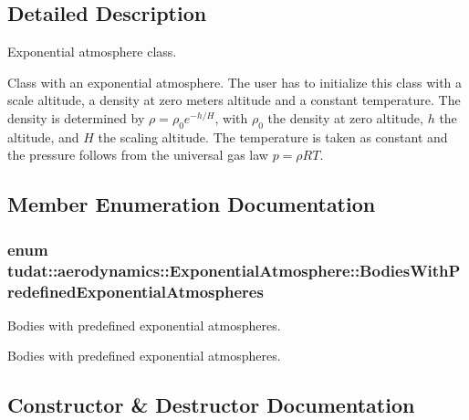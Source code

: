 \subsection{Detailed Description}
Exponential atmosphere class. 

Class with an exponential atmosphere. The user has to initialize this class with a scale altitude, a density at zero meters altitude and a constant temperature. The density is determined by $ \rho = \rho_0 e^{-h/H} $, with $ \rho_0 $ the density at zero altitude, $ h $ the altitude, and $ H $ the scaling altitude. The temperature is taken as constant and the pressure follows from the universal gas law $ p = \rho RT $. 

\subsection{Member Enumeration Documentation}
\subsubsection[{\texorpdfstring{Bodies\+With\+Predefined\+Exponential\+Atmospheres}{BodiesWithPredefinedExponentialAtmospheres}}]{\setlength{\rightskip}{0pt plus 5cm}enum {\bf tudat\+::aerodynamics\+::\+Exponential\+Atmosphere\+::\+Bodies\+With\+Predefined\+Exponential\+Atmospheres}}\hypertarget{classtudat_1_1aerodynamics_1_1ExponentialAtmosphere_a86631e9491185c2c0b8681acf2a13016}{}\label{classtudat_1_1aerodynamics_1_1ExponentialAtmosphere_a86631e9491185c2c0b8681acf2a13016}


Bodies with predefined exponential atmospheres. 

Bodies with predefined exponential atmospheres. 

\subsection{Constructor \& Destructor Documentation}
